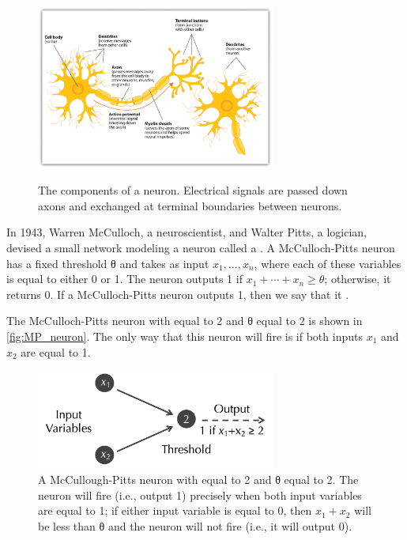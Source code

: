 \begin{figure}[h]
\centering
\mySfFamily
\includegraphics[width = 0.7\textwidth]{../images/components_of_neuron.png}\\[4ex]
\caption{The components of a neuron. Electrical signals are passed down axons and exchanged at terminal boundaries between neurons.}
\label{fig:components_of_neuron}
\end{figure}

In 1943, Warren McCulloch, a neuroscientist, and Walter Pitts, a logician, devised a small network modeling a neuron called a . A McCulloch-Pitts neuron has a fixed threshold θ and takes as input   $x_1, \ldots, x_n$, where each of these variables is equal to either 0 or 1. The neuron outputs 1 if $x_1 + \cdots + x_n \geq θ$; otherwise, it returns 0. If a McCulloch-Pitts neuron outputs 1, then we say that it .

The McCulloch-Pitts neuron with  equal to 2 and θ equal to 2 is shown in \autoref{fig:MP_neuron}. The only way that this neuron will fire is if both inputs $x_1$ and $x_2$ are equal to 1.\\

\begin{figure}[h]
\centering
\mySfFamily
\includegraphics[width = 0.7\textwidth]{../images/MP_neuron.png}
\caption{A McCullough-Pitts neuron with  equal to 2 and θ equal to 2. The neuron will fire (i.e., output 1) precisely when both input variables are equal to 1; if either input variable is equal to 0, then $x_1 + x_2$ will be less than θ and the neuron will not fire (i.e., it will output 0).}
\label{fig:components_of_neuron}
\end{figure}

